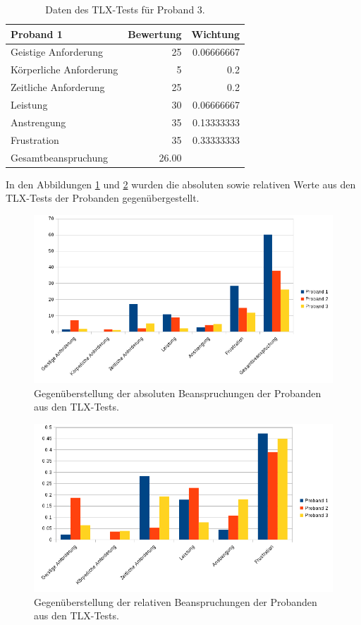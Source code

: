 \begin{table}[h]
    \caption{Daten des TLX-Tests für Proband 3.}
    \centering
    \begin{tabular}{l r r}
        Proband 1 & Bewertung & Wichtung \\
        \hline
        Geistige Anforderung & 25 & 0.06666667 \\
        Körperliche Anforderung & 5 & 0.2 \\
        Zeitliche Anforderung & 25 & 0.2 \\
        Leistung & 30 & 0.06666667 \\
        Anstrengung & 35 & 0.13333333 \\
        Frustration & 35 & 0.33333333 \\
        \hline
        Gesamtbeanspruchung & 26.00 & \\
    \end{tabular}
\end{table}

In den Abbildungen \ref{fig:absolut} und \ref{fig:relativ} wurden die absoluten sowie relativen Werte aus den TLX-Tests der Probanden gegenübergestellt.

\begin{figure}[!htb]
    \includegraphics[width=\textwidth]{../diagramme/absolute_beanspruchung.png}
    \caption{\label{fig:absolut}Gegenüberstellung der absoluten Beanspruchungen der Probanden aus den TLX-Tests.}
\end{figure}

\begin{figure}[!htb]
    \includegraphics[width=\textwidth]{../diagramme/relative_beanspruchung.png}
    \caption{\label{fig:relativ}Gegenüberstellung der relativen Beanspruchungen der Probanden aus den TLX-Tests.}
\end{figure}
